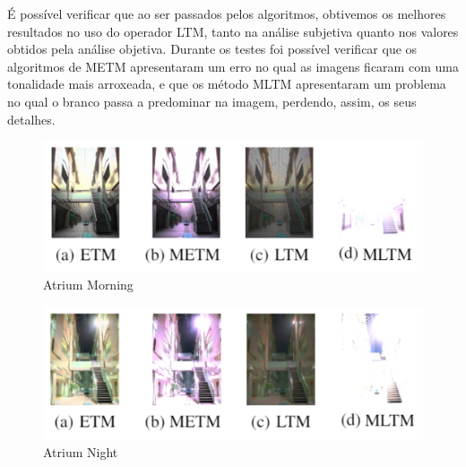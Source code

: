 \documentclass[conference]{IEEEtran}
\begin{document}
É possível verificar que ao ser passados pelos algoritmos, obtivemos os melhores resultados no uso do operador LTM, tanto na análise subjetiva quanto nos valores obtidos pela análise objetiva. Durante os testes foi possível verificar que os algoritmos de METM apresentaram um erro no qual as imagens ficaram com uma tonalidade mais arroxeada, e que os método MLTM apresentaram um problema no qual o branco passa a predominar na imagem, perdendo, assim, os seus detalhes.

\begin{figure}[!htp]
    \centering
    \includegraphics[scale=.27]{Imagens/AtriumMorning-Compare.png}
    \caption{Atrium Morning \cite{HDR_Dataset}}
    \label{fig:atMorn}
\end{figure}

\begin{figure}[!htp]
    \centering
    \includegraphics[scale=.27]{Imagens/AtriumNight-Compare.png}
    \caption{Atrium Night \cite{HDR_Dataset}}
    \label{fig:atN}
\end{figure}

\end{document}
